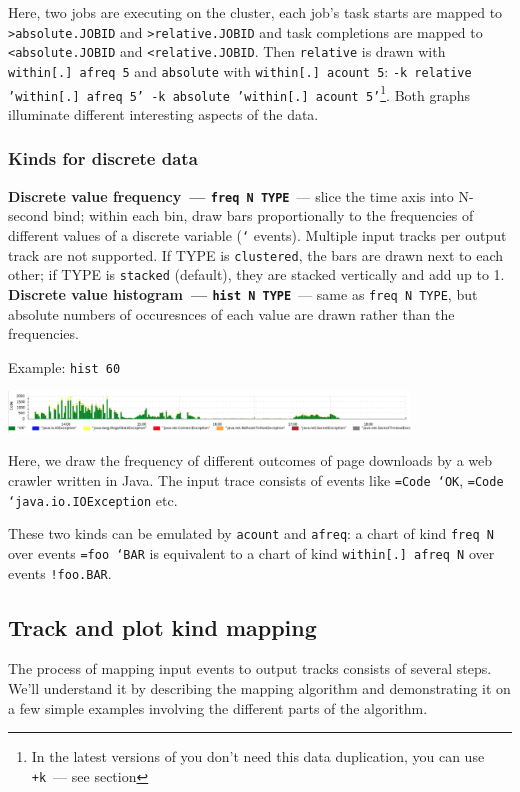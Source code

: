 \documentclass{article}
\begin{document}
Here, two jobs are executing on the cluster, each job's task starts are mapped to \texttt{>absolute.JOBID} and \texttt{>relative.JOBID} and task completions are mapped to \texttt{<absolute.JOBID} and \texttt{<relative.JOBID}. Then \texttt{relative} is drawn with \texttt{within[.] afreq 5} and \texttt{absolute} with \texttt{within[.] acount 5}: \texttt{-k relative 'within[.] afreq 5' -k absolute 'within[.] acount 5'}\footnote{In the latest versions of \timeplot{} you don't need this data duplication, you can use \texttt{+k}~--- see section }. Both graphs illuminate different interesting aspects of the data.

\pagebreak
\subsubsection{Kinds for discrete data}
\noindent
\textbf{Discrete value frequency~--- \texttt{freq N TYPE}}~--- slice the time axis into N-second bind; within each bin, draw bars proportionally to the frequencies of different values of a discrete variable (\texttt{`} events). Multiple input tracks per output track are not supported. If TYPE is \texttt{clustered}, the bars are drawn next to each other; if TYPE is \texttt{stacked} (default), they are stacked vertically and add up to 1.
\noindent
\textbf{Discrete value histogram~--- \texttt{hist N TYPE}}~--- same as \texttt{freq N TYPE}, but absolute numbers of occuresnces of each value are drawn rather than the frequencies.

Example: \texttt{hist 60}

\centerline{\includegraphics[width=0.8\textwidth]{pics/tplot/hist.png}}

Here, we draw the frequency of different outcomes of page downloads by a web crawler written in Java. The input trace consists of events like \texttt{=Code `OK}, \texttt{=Code `java.io.IOException} etc.

These two kinds can be emulated by \texttt{acount} and \texttt{afreq}: a chart of kind \texttt{freq N} over events \texttt{=foo `BAR} is equivalent to a chart of kind \texttt{within[.] afreq N} over events \texttt{!foo.BAR}.

\pagebreak
\subsection{Track and plot kind mapping}
\label{sec:tplot-track-mapping}
The process of mapping input events to output tracks consists of several steps. We'll understand it by describing the mapping algorithm and demonstrating it on a few simple examples involving the different parts of the algorithm.
\end{document}
